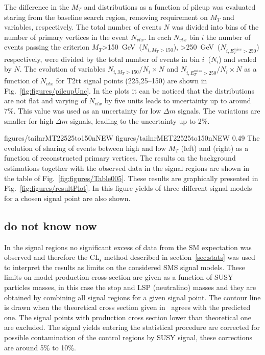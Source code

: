 The difference in the $M_{T}$ and \MET distributions as a function of pileup was evaluated staring from the baseline search region, removing requirement on $M_{T}$ and \MET variables, respectively. The total number of events $N$ was divided into bins of the number of primary vertices in the event $N_{vtx}$. In each $N_{vtx}$ bin $i$ the number of events passing the criterion $M_{T}$>150~GeV~($N_{i,M_{T}>150}$), \MET>250~GeV~($N_{i,E_{T}^{miss}>250}$) respectively, were divided by the total number of events in bin $i$~($N_{i}$) and scaled by $N$. The evolution of variables $N_{i,M_{T}>150}/N_{i} \times N$ and $N_{i,E_{T}^{miss}>250}/N_{i} \times N$ as a function of $N_{vtx}$ for T2tt signal points (225,25--150) are shown in Fig.~\ref{fig:figures/pileupUnc}. In the plots it can be noticed that  the distributions are not flat and varying of $N_{vtx}$ by five units leads to uncertainty up to around 7\%. This value was used as an uncertainty for low $\Delta m$ signals. The variations are smaller for high $\Delta m$ signals, leading to the uncertainty up to 2\%.

                 {figures/tailnrMT22525to150nNEW} %
                 {figures/tailnrMET22525to150nNEW} %
                 {0.49}       %
                 { The evolution of sharing of events between high and low $M_{T}$ (left) and \MET (right) as a function of reconstructed primary vertices. }
The results on the background estimations together with the observed data in the signal regions are shown in the table of Fig.~\ref{fig:figures/Table005}. These results are graphically presented in Fig.~\ref{fig:figures/resultPlot}. In this figure yields of three different signal models for a chosen signal point are also shown. 

\subsection{do not know now}

In the signal regions no significant excess of data from the SM expectation was observed and therefore the $\mathrm{CL_{s}}$ method described in section~\ref{sec:stats} was used to interpret the results as limits on the considered SMS signal models. These limits on model production cross-section are given as a function of SUSY particles masses, in this case the stop and LSP (neutralino) masses and they are obtained by combining all signal regions for a given signal point. The contour line is drawn when the theoretical cross section given in~\cite{Borschensky:2014cia} agrees with the predicted one. The signal points with production cross section lower than theoretical one are excluded. The signal yields entering the statistical procedure are corrected for possible contamination of the control regions by SUSY signal, these corrections are around 5\% to 10\%.


